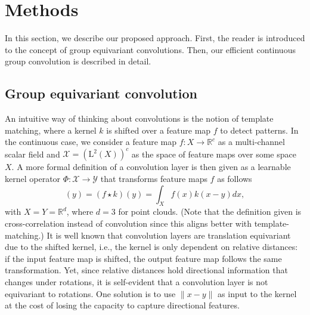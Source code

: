 \section{Methods}
\label{sec:methods}

In this section, we describe our proposed approach.
First, the reader is introduced to the concept of group equivariant convolutions. Then, our efficient continuous group convolution is described in detail.


\subsection{Group equivariant convolution}

An intuitive way of thinking about convolutions is the notion of template matching, where a kernel $k$ is 
shifted over a feature map $f$ to detect patterns. In the continuous case, we consider a feature map $f: X \rightarrow \mathbb{R}^c$ as a multi-channel scalar field and $\mathcal{X} = (\text{L}^2(X))^c$ as the space of feature maps over some space $X$. A more formal definition of a convolution layer is then given as a learnable kernel operator $\Phi: \mathcal{X}\rightarrow \mathcal{Y}$ that transforms feature maps $f$ as follows
\begin{equation}
[\Phi f](y) = (f \star k)(y) = \int_{X} f(x) k(x-y) d x,
\end{equation}
with $X=Y=\mathbb{R}^d$, where $d=3$ for point clouds. (Note that the definition given is cross-correlation instead of convolution since this aligns better with template-matching.) It is well known that convolution layers are translation equivariant due to the shifted kernel, i.e., the kernel is only dependent on relative distances: if the input feature map is shifted, the output feature map follows the same transformation. Yet, since relative distances hold directional information that changes under rotations, it is self-evident that a convolution layer is not equivariant to rotations. One solution is to use $\| x- y \|$ as input to the kernel at the cost of losing the capacity to capture directional features.

